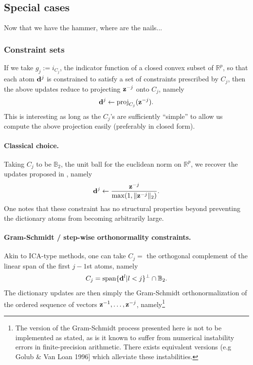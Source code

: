 \subsection{Special cases}
Now that we have the hammer, where are the nails...
\subsubsection{Constraint sets}
If we take $g_j := i_{C_j}$, the indicator function of a closed convex subset of $\mathbb R^p$, so that each atom $\mathbf{d}^j$ is constrained to satisfy a set of constraints prescribed by $C_j$, then the above updates reduce to projecting $\mathbf{z}^{-j}$ onto $C_j$, namely
\begin{equation}
\mathbf{d}^j \leftarrow  \text{proj}_{C_j}(\mathbf{z}^{-j}).
\end{equation}
This is interesting as long as the $C_j$'s are sufficiently ``simple'' to allow us compute the above projection easily (preferably in closed form).
\paragraph{Classical choice.}

Taking $C_j$ to be $\mathbb B_2$, the unit ball for the euclidean norm on  $\mathbb R^p$, we recover the updates proposed in \citep{mairal2009,mairal2010}, namely
\begin{equation}
\mathbf{d}^j \leftarrow  \frac{\mathbf{z}^{-j}}{\max(1,\|\mathbf{z}^{-j}\|_2)}.
\end{equation}
One notes that these constraint has no structural properties beyond preventing the dictionary atoms from becoming arbitrarily large.

\paragraph{Gram-Schmidt / step-wise orthonormality constraints.}
Akin to ICA-type methods, one can take $C_j =$ the orthogonal complement of the linear span of the first $j-1$st atoms, namely
  \begin{equation}
    C_{j} = \text{span}\{\mathbf{d}^l | l < j\}^\perp \cap \mathbb B_{2}.
  \end{equation}
  The dictionary updates are then simply the Gram-Schmidt orthonormalization of the ordered sequence of vectors $\mathbf{z}^{-1},\ldots,\mathbf{z}^{-j}$, namely\footnote{The version of the Gram-Schmidt process presented here is not to be implemented as stated, as is it known to suffer from numerical instability errors in finite-precision arithmetic. There exists equivalent versions (e.g Golub \& Van Loan 1996] which alleviate these instabilities.}

